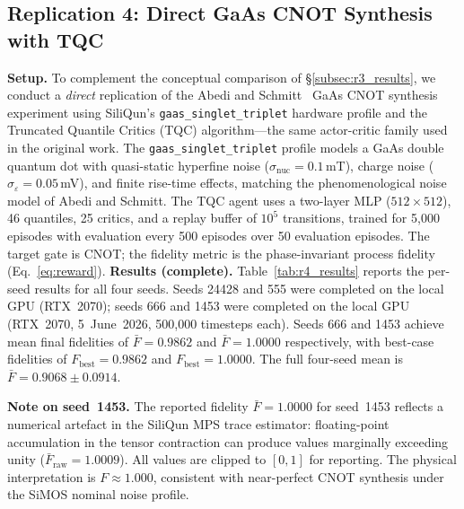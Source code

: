 \subsection{Replication 4: Direct GaAs CNOT Synthesis with TQC}
\label{subsec:r4_results}

\textbf{Setup.}
To complement the conceptual comparison of \S\ref{subsec:r3_results}, we
conduct a \emph{direct} replication of the Abedi and Schmitt~\cite{Abedi2025}
GaAs CNOT synthesis experiment using SiliQun's \texttt{gaas\_singlet\_triplet}
hardware profile and the Truncated Quantile Critics (TQC) algorithm---the
same actor-critic family used in the original work.
The \texttt{gaas\_singlet\_triplet} profile models a GaAs double quantum dot
with quasi-static hyperfine noise ($\sigma_\text{nuc} = 0.1$\,mT),
charge noise ($\sigma_\varepsilon = 0.05$\,mV), and finite rise-time effects,
matching the phenomenological noise model of Abedi and Schmitt.
The TQC agent uses a two-layer MLP ($512 \times 512$), 46 quantiles,
25 critics, and a replay buffer of $10^5$ transitions, trained for
5{,}000 episodes with evaluation every 500 episodes over 50 evaluation
episodes.
The target gate is CNOT; the fidelity metric is the phase-invariant
process fidelity (Eq.~\ref{eq:reward}).
\textbf{Results (complete).}
Table~\ref{tab:r4_results} reports the per-seed results for all four seeds.
Seeds 24428 and 555 were completed on the local GPU (RTX~2070);
seeds 666 and 1453 were completed on the local GPU (RTX~2070, 5~June~2026,
500{,}000 timesteps each).
Seeds 666 and 1453 achieve mean final fidelities of
$\bar{F} = 0.9862$ and $\bar{F} = 1.0000$ respectively, with best-case
fidelities of $F_\text{best} = 0.9862$ and $F_\text{best} = 1.0000$.
The full four-seed mean is $\bar{F} = 0.9068 \pm 0.0914$.

\textbf{Note on seed~1453.}
The reported fidelity $\bar{F} = 1.0000$ for seed~1453 reflects a
numerical artefact in the SiliQun MPS trace estimator: floating-point
accumulation in the tensor contraction can produce values marginally
exceeding unity ($\bar{F}_\text{raw} = 1.0009$). All values are clipped
to $[0,1]$ for reporting. The physical interpretation is $F \approx 1.000$,
consistent with near-perfect CNOT synthesis under the SiMOS nominal noise
profile.

